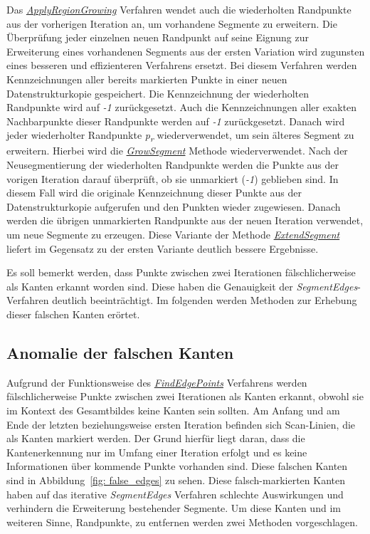 Das \textit{\hyperref[alg:apply_region_growing]{ApplyRegionGrowing}} Verfahren wendet auch die wiederholten Randpunkte aus der vorherigen Iteration an, um vorhandene Segmente zu erweitern. Die Überprüfung jeder einzelnen neuen Randpunkt auf seine Eignung zur Erweiterung eines vorhandenen Segments aus der ersten Variation wird zugunsten eines besseren und effizienteren Verfahrens ersetzt. Bei diesem Verfahren werden Kennzeichnungen aller bereits markierten Punkte in einer neuen Datenstrukturkopie gespeichert. Die Kennzeichnung der wiederholten Randpunkte wird auf \textit{-1} zurückgesetzt. Auch die Kennzeichnungen aller exakten Nachbarpunkte dieser Randpunkte werden auf \textit{-1} zurückgesetzt. Danach wird jeder wiederholter Randpunkte \textit{p\textsubscript{r}} wiederverwendet, um sein älteres Segment zu erweitern. Hierbei wird die \textit{\hyperref[alg:grow_segment]{GrowSegment}} Methode wiederverwendet. Nach der Neusegmentierung der wiederholten Randpunkte werden die Punkte aus der vorigen Iteration darauf überprüft, ob sie unmarkiert (\textit{-1}) geblieben sind. In diesem Fall wird die originale Kennzeichnung dieser Punkte aus der Datenstrukturkopie aufgerufen und den Punkten wieder zugewiesen. Danach werden die übrigen unmarkierten Randpunkte aus der neuen Iteration verwendet, um neue Segmente zu erzeugen. Diese Variante der Methode \textit{\hyperref[alg: extend_segments]{ExtendSegment}} liefert im Gegensatz zu der ersten Variante deutlich bessere Ergebnisse.

Es soll bemerkt werden, dass Punkte zwischen zwei Iterationen fälschlicherweise als Kanten erkannt worden sind. Diese haben die Genauigkeit der \textit{SegmentEdges}-Verfahren deutlich beeinträchtigt. Im folgenden werden Methoden zur Erhebung dieser falschen Kanten erörtet.

\subsection{Anomalie der falschen Kanten} \label{false_edges}
Aufgrund der Funktionsweise des \textit{\hyperref[alg:find_edge_points]{FindEdgePoints}} Verfahrens werden fälschlicherweise Punkte zwischen zwei Iterationen als Kanten erkannt, obwohl sie im Kontext des Gesamtbildes keine Kanten sein sollten. Am Anfang und am Ende der letzten beziehungsweise ersten Iteration befinden sich Scan-Linien, die als Kanten markiert werden. Der Grund hierfür liegt daran, dass die Kantenerkennung nur im Umfang einer Iteration erfolgt und es keine Informationen über kommende Punkte vorhanden sind. Diese falschen Kanten sind in Abbildung~\ref{fig: false_edges} zu sehen. Diese falsch-markierten Kanten haben auf das iterative \textit{SegmentEdges} Verfahren schlechte Auswirkungen und verhindern die Erweiterung bestehender Segmente. Um diese Kanten und im weiteren Sinne, Randpunkte, zu entfernen werden zwei Methoden vorgeschlagen.

